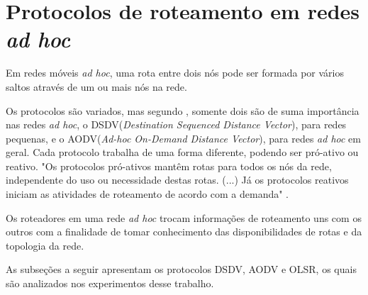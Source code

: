 \section{Protocolos de roteamento em redes \textit{ad hoc}}

Em redes m\'oveis \textit{ad hoc}, uma rota entre dois n\'os pode ser formada por v\'arios saltos atrav\'es de um ou mais n\'os na rede. 

Os protocolos s\~ao variados, mas segundo \cite{gorantala}, somente dois s\~ao de suma import\^ancia nas redes \textit{ad hoc}, o DSDV(\textit{Destination Sequenced Distance Vector}), para redes pequenas, e o AODV(\textit{Ad-hoc On-Demand Distance Vector}), para redes \textit{ad hoc} em geral. 
Cada protocolo trabalha de uma forma diferente, podendo ser pr\'o-ativo ou reativo. 
"Os protocolos pr\'o-ativos mant\^em rotas para todos os n\'os da rede, independente do uso ou necessidade destas rotas. (...) J\'a os protocolos reativos iniciam as atividades de roteamento de acordo com a demanda" \cite{pereira}.

Os roteadores em uma rede \textit{ad hoc} trocam informa\c{c}\~oes de roteamento uns com os outros com a finalidade de tomar conhecimento das disponibilidades de rotas e da topologia da rede.\cite{pereira}

As subse\c{c}\~oes a seguir apresentam os protocolos DSDV, AODV e OLSR, os quais são analizados nos experimentos desse trabalho.

